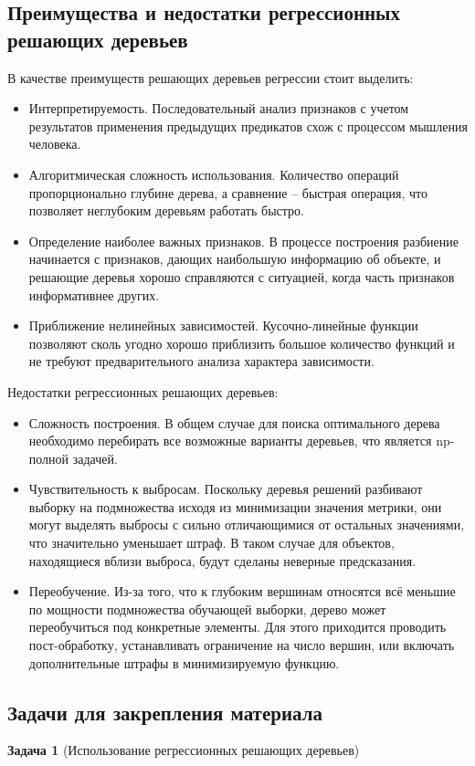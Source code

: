 \subsection{Преимущества и недостатки регрессионных решающих деревьев}

В качестве преимуществ решающих деревьев регрессии стоит выделить:
\begin{itemize}
    \item Интерпретируемость. Последовательный анализ признаков с учетом результатов применения предыдущих предикатов схож с процессом мышления человека.
    \item Алгоритмическая сложность использования. Количество операций пропорционально глубине дерева, а сравнение -- быстрая операция, что позволяет неглубоким деревьям работать быстро.
    \item Определение наиболее важных признаков. В процессе построения разбиение начинается с признаков, дающих наибольшую информацию об объекте, и решающие деревья хорошо справляются с ситуацией, когда часть признаков информативнее других.
    \item Приближение нелинейных зависимостей. Кусочно-линейные функции позволяют сколь угодно хорошо приблизить большое количество функций и не требуют предварительного анализа характера зависимости.
\end{itemize}

Недостатки регрессионных решающих деревьев:
\begin{itemize}
    \item Сложность построения. В общем случае для поиска оптимального дерева необходимо перебирать все возможные варианты деревьев, что является np-полной задачей.
    \item Чувствительность к выбросам. Поскольку деревья решений разбивают выборку на подмножества исходя из минимизации значения метрики, они могут выделять выбросы с сильно отличающимися от остальных значениями, что значительно уменьшает штраф. В таком случае для объектов, находящиеся вблизи выброса, будут сделаны неверные предсказания. 
    \item Переобучение. Из-за того, что к глубоким вершинам относятся всё меньшие по мощности подмножества обучающей выборки, дерево может переобучиться под конкретные элементы. Для этого приходится проводить пост-обработку, устанавливать ограничение на число вершин, или включать дополнительные штрафы в минимизируемую функцию.
\end{itemize}

\subsection{Задачи для закрепления материала}
\textbf{Задача 1} (Использование регрессионных решающих деревьев)

